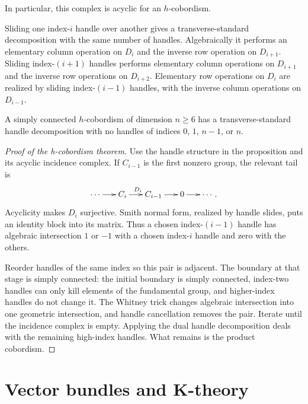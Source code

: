 In particular, this complex is acyclic for an
$h$-cobordism.

\begin{lemma}
\label{at-lemma-handle-slides}
Sliding one index-$i$ handle over another
gives a transverse-standard decomposition
with the same number of handles.
Algebraically
it performs an elementary column operation on
$D_i$ and the inverse row operation on
$D_{i+1}$.  Sliding index-$(i+1)$ handles
performs elementary column operations on
$D_{i+1}$ and the inverse row operations on
$D_{i+2}$.  Elementary row operations on
$D_i$ are realized by sliding index-$(i-1)$
handles, with the inverse column operations
on $D_{i-1}$.
\end{lemma}

\begin{proposition}
\label{at-proposition-middle-index-handles}
A simply connected $h$-cobordism of dimension
$n\geq6$ has a transverse-standard handle
decomposition with no handles of indices
$0$, $1$, $n-1$, or $n$.
\end{proposition}

\begin{proof}[Proof of the
h-cobordism theorem]
Use the handle structure in the proposition
and its acyclic incidence complex.  If
$C_{i-1}$ is the first nonzero group, the
relevant tail is
$$
\xymatrix@C=16pt{
\cdots\ar[r]&C_i\ar[r]^{D_i}&
C_{i-1}\ar[r]&0\ar[r]&\cdots .
}
$$
Acyclicity makes $D_i$ surjective.  Smith
normal form, realized by handle slides, puts
an identity block into its matrix.  Thus a
chosen index-$(i-1)$ handle has algebraic
intersection $1$ or $-1$ with a chosen
index-$i$ handle and zero with the others.

Reorder handles of the same index so this
pair is adjacent.  The boundary at that stage
is simply connected: the initial boundary is
simply connected, index-two handles can only
kill elements of the fundamental group, and
higher-index handles do not change it.  The
Whitney trick changes algebraic intersection
into one geometric intersection, and handle
cancellation removes the pair.  Iterate until
the incidence complex is empty.  Applying the
dual handle decomposition deals with the
remaining high-index handles.  What remains
is the product cobordism.
\end{proof}
\section{Vector bundles and K-theory}
\label{section-vector-bundles-k-theory}

